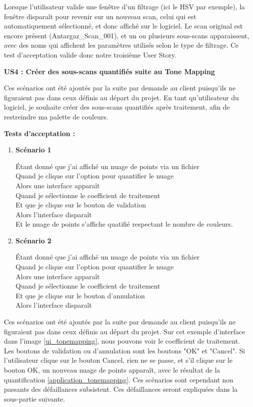 \documentclass[12pt,titlepage,french]{article}
\begin{document}
Lorsque l'utilisateur valide une fenêtre d'un filtrage (ici le HSV par exemple), la fenêtre disparaît pour revenir sur un nouveau scan, celui qui est automatiquement sélectionné, et donc affiché sur le logiciel. Le scan original est encore présent (Antargaz\_Scan\_001), et un ou plusieurs sous-scans apparaissent, avec des noms qui affichent les paramètres utilisés selon le type de filtrage. Ce test d'acceptation valide donc notre troisième User Story.\newline

\textbf{\og US4 : Créer des sous-scans quantifiés suite au Tone Mapping\fg{}}

Ces scénarios ont été ajoutés par la suite par demande au client puisqu'ils ne figuraient pas dans ceux définis au départ du projet.
En tant qu'utilisateur du logiciel, je souhaite créer des sous-scans quantifiés après traitement, afin de restreindre ma palette de couleurs.

\textbf{Tests d'acceptation :}
\begin{enumerate}
    \item \textbf{Scénario 1}

Étant donné que j'ai affiché un nuage de points via un fichier\\
Quand je clique sur l'option pour quantifier le nuage\\
Alors une interface apparaît\\
Quand je sélectionne le coefficient de traitement\\
Et que je clique sur le bouton de validation\\
Alors l'interface disparaît\\
Et le nuage de points s'affiche quatifié respectant le nombre de couleurs.

    \item \textbf{Scénario 2}

Étant donné que j'ai affiché un nuage de points via un fichier\\
Quand je clique sur l'option pour quantifier le nuage\\
Alors une interface apparaît\\
Quand je sélectionne le coefficient de traitement\\
Et que je clique sur le bouton d'annulation\\
Alors l'interface disparaît\\
\end{enumerate}


Ces scénarios ont été ajoutés par la suite par demande au client puisqu'ils ne figuraient pas dans ceux définis au départ du projet.
Sur cet exemple d'interface dans l'image \ref{ui_tonemapping}, nous pouvons voir le coefficient de traitement. Les boutons de validation ou d'annulation sont les boutons "OK" et "Cancel". Si l'utilisateur clique sur le bouton Cancel, rien ne se passe, et s'il clique sur le bouton OK, un nouveau nuage de points apparaît, avec le résultat de la quantification \ref{application_tonemapping}. Ces scénarios sont cependant non passants des défaillances subsistent. Ces défaillances seront expliquées dans la sous-partie suivante. \newline
\end{document}
